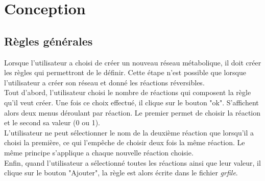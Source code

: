 \chapter{Conception}

\section{Règles générales}
Lorsque l'utilisateur a choisi de créer un nouveau réseau métabolique, il doit créer les règles qui permettront de le définir. Cette étape n'est possible que lorsque l'utilisateur a créer son réseau et donné les réactions réversibles.\\

Tout d'abord, l'utilisateur choisi le nombre de réactions qui composent la règle qu'il veut créer.
Une fois ce choix effectué, il clique sur le bouton "ok". S'affichent alors deux menus déroulant par réaction. Le premier permet de choisir la réaction et le second sa valeur (0 ou 1).\\

L'utilisateur ne peut sélectionner le nom de la deuxième réaction que lorsqu'il a choisi la première, ce qui l'empêche de choisir deux fois la même réaction. Le même principe s'applique a chaque nouvelle réaction choisie.\\

Enfin, quand l'utilisateur a sélectionné toutes les réactions ainsi que leur valeur, il clique sur le bouton "Ajouter", la règle est alors écrite dans le fichier \emph{grfile}.